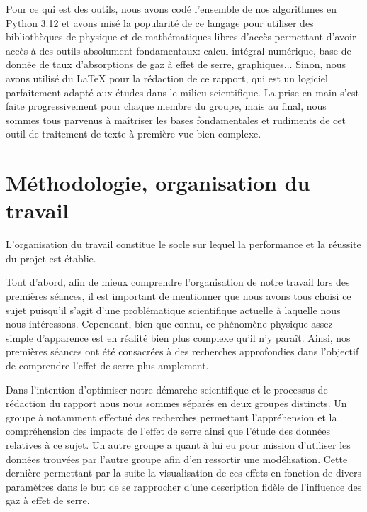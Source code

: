 \documentclass[a4paper, 12pt]{report} %
\begin{document}
\indent Pour ce qui est des outils, nous avons codé l'ensemble de nos algorithmes en Python 3.12 et avons misé
la popularité de ce langage pour utiliser des bibliothèques de physique et de mathématiques libres d'accès
permettant d'avoir accès à des outils absolument fondamentaux: calcul intégral numérique, 
base de donnée de taux d'absorptions de gaz à effet de serre, graphiques... Sinon, nous avons utilisé du \LaTeX
pour la rédaction de ce rapport, qui est un logiciel parfaitement adapté aux études dans le milieu scientifique.
La prise en main s'est faite progressivement pour chaque membre du groupe, mais au final, nous sommes tous parvenus
à maîtriser les bases fondamentales et rudiments de cet outil de traitement de texte à première vue bien complexe.


\chapter{Méthodologie, organisation du travail}


\indent L'organisation du travail constitue le socle sur lequel la performance et la réussite du projet est établie. \vspace{\baselineskip}

Tout d’abord, afin de mieux comprendre l’organisation de notre travail lors des premières séances, il est important de mentionner que nous avons tous choisi ce sujet puisqu’il s’agit d’une problématique scientifique actuelle à laquelle nous nous intéressons. Cependant, bien que connu, ce phénomène physique assez simple d’apparence est en réalité bien plus complexe qu’il n’y paraît. Ainsi, nos premières séances ont été consacrées à des recherches approfondies dans l’objectif de comprendre l’effet de serre plus amplement.\vspace{\baselineskip}

Dans l’intention d'optimiser notre démarche scientifique et le processus de rédaction du rapport nous nous sommes séparés en deux groupes distincts. 
Un groupe à notamment effectué des recherches permettant l'appréhension et la compréhension des impacts de l'effet de serre ainsi que l'étude des données relatives à ce sujet. Un autre groupe a quant à lui eu pour mission d'utiliser les données trouvées par l'autre groupe afin d'en ressortir une modélisation. Cette dernière permettant par la suite la visualisation de ces effets en fonction de divers paramètres dans le but de se rapprocher d'une description fidèle de l'influence des gaz à effet de serre.\vspace{\baselineskip}
\end{document}
